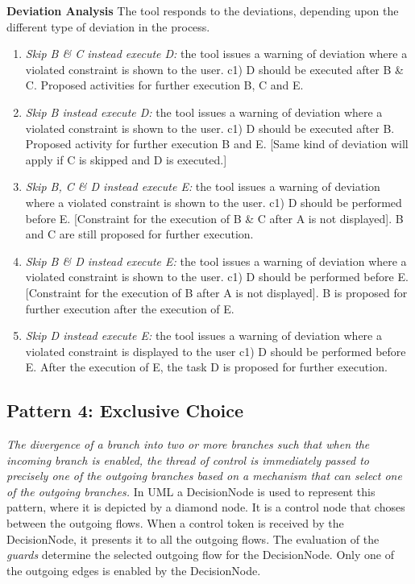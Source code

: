 \documentclass[twoside,a4paper]{refart}
\begin{document}
\noindent\textbf{Deviation Analysis}
The tool responds to the deviations, depending upon the different type of deviation in the process.
\begin{enumerate}
\item \emph{Skip B \& C instead execute D:} the tool issues a warning of deviation where a violated constraint is shown to the user.  c1) D should be executed after B \& C.  Proposed activities for further execution B, C and E. 
\item \emph{Skip B instead execute D:} the tool issues a warning of deviation where a violated constraint is shown to the user.  c1) D should be executed after B.  Proposed activity for further execution B and E.  [Same kind of deviation will apply if C is skipped and D is executed.]
\item \emph{Skip B, C \& D instead execute E:} the tool issues a warning of deviation where a violated constraint is shown to the user.  c1) D should be performed before E.  [Constraint for the execution of B \& C after A is not displayed]. B and C are still proposed for further execution.
\item \emph{Skip B \& D instead execute E:} the tool issues a warning of deviation where a violated constraint is shown to the user.  c1) D should be performed before E.  [Constraint for the execution of B after A is not displayed]. B is proposed for further execution after the execution of E.
\item \emph{Skip D instead execute E:} the tool issues a warning of deviation where a violated constraint is displayed to the user c1) D should be performed before E.  After the execution of E, the task D is proposed for further execution. 
\end{enumerate}



\subsection{Pattern 4: Exclusive Choice}
\label{pattern4}
\emph{The divergence of a branch into two or more branches such that when the incoming branch is enabled, the thread of control is immediately passed to precisely one of the outgoing branches based on a mechanism that can select one of the outgoing branches.} In UML a DecisionNode is used to represent this pattern, where it is depicted by a diamond node. It is a control node that choses between the outgoing flows.  When a control token is received by the DecisionNode, it presents it to all the outgoing flows.  The evaluation of the \emph{guards} determine the selected outgoing flow for the DecisionNode.  Only one of the outgoing edges is enabled by the DecisionNode.
\end{document}
